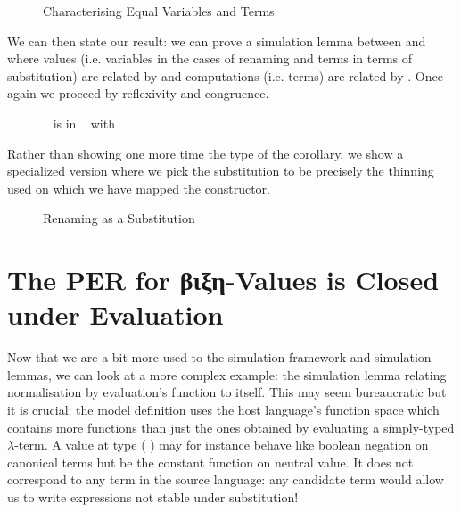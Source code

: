 \begin{figure}[h]
\caption{Characterising Equal Variables and Terms\label{fig:vartermR}}
\end{figure}

We can then state our result: we can prove a simulation lemma between 
and  where values (i.e. variables in the cases of renaming and terms
in terms of substitution) are related by  and computations (i.e. terms)
are related by . Once again we proceed by reflexivity and congruence.

\begin{figure}[h]
\caption{~ is in ~ with \label{fig:renissub}}
\end{figure}

Rather than showing one more time the type of the corollary, we show a specialized
version where we pick the substitution to be precisely the thinning used on which we
have mapped the  constructor.

\begin{figure}[h]
\caption{Renaming as a Substitution\label{fig:renassub}}
\end{figure}

\section{The PER for βιξη-Values is Closed under Evaluation}

Now that we are a bit more used to the simulation framework and simulation lemmas,
we can look at a more complex example: the simulation lemma relating normalisation
by evaluation's  function to itself. This may seem bureaucratic but it is
crucial: the model definition uses the host language's function space which contains
more functions than just the ones obtained by evaluating a simply-typed $λ$-term.
A value at type {(  )} may for instance behave like
boolean negation on canonical terms but be the constant  function on neutral
value. It does not correspond to any term in the source language: any candidate term
would allow us to write expressions not stable under substitution!

